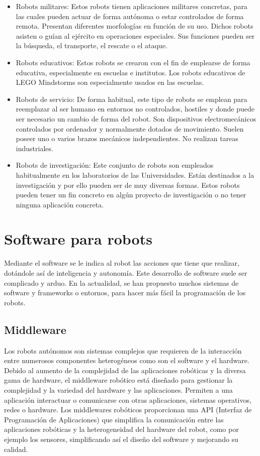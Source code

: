 \begin{itemize}
\begin{itemize}
		\item Robots militares: Estos robots tienen aplicaciones militares concretas, para las cuales pueden actuar de forma autónoma o estar controlados de forma remota. Presentan diferentes morfologías en función de su uso. Dichos robots asisten o guían al ejército en operaciones especiales. Sus funciones pueden ser la búsqueda, el transporte, el rescate o el ataque.
		\item Robots educativos: Estos robots se crearon con el fin de emplearse de forma educativa, especialmente en escuelas e institutos. Los robots educativos de LEGO Mindstorms son especialmente usados en las escuelas.
		\item Robots de servicio: De forma habitual, este tipo de robots se emplean para reemplazar al ser humano en entornos no controlados, hostiles y donde puede ser necesario un cambio de forma del robot. Son dispositivos electromecánicos controlados por ordenador y normalmente dotados de movimiento. Suelen poseer uno o varios brazos mecánicos independientes. No realizan tareas industriales.
		\item Robots de investigación: Este conjunto de robots son empleados habitualmente en los laboratorios de las Universidades. Están destinados a la investigación y por ello pueden ser de muy diversas formas. Estos robots pueden tener un fin concreto en algún proyecto de investigación o no tener ninguna aplicación concreta.
	\end{itemize}
\end{itemize}


\section{Software para robots}
Mediante el software se le indica al robot las acciones que tiene que realizar, dotándole así de inteligencia y autonomía. Este desarrollo de software suele ser complicado y arduo. En la actualidad, se han propuesto muchos sistemas de software y frameworks o entornos, para hacer más fácil la programación de los robots. 

\subsection{Middleware}
Los robots autónomos son sistemas complejos que requieren de la interacción entre numerosos componentes heterogéneos como son el software y el hardware. Debido al aumento de la complejidad de las aplicaciones robóticas y la diversa gama de hardware, el middleware robótico está diseñado para gestionar la complejidad y la variedad del hardware y las aplicaciones. Permiten a una aplicación interactuar o comunicarse con otras aplicaciones, sistemas operativos, redes o hardware. Los middlewares robóticos proporcionan una API (Interfaz de Programación de Aplicaciones) que simplifica la comunicación entre las aplicaciones robóticas y la heterogeneidad del hardware del robot, como por ejemplo los sensores, simplificando así el diseño del software y mejorando su calidad. 

